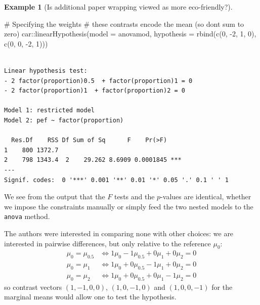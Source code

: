 \documentclass[
  11pt,
  letterpaper,
]{scrbook}
\newenvironment{Shaded}{\begin{snugshade}}{\end{snugshade}}
\newcommand{\AttributeTok}[1]{\textcolor[rgb]{0.40,0.45,0.13}{#1}}
\newcommand{\CommentTok}[1]{\textcolor[rgb]{0.37,0.37,0.37}{#1}}
\newcommand{\DecValTok}[1]{\textcolor[rgb]{0.68,0.00,0.00}{#1}}
\newcommand{\FunctionTok}[1]{\textcolor[rgb]{0.28,0.35,0.67}{#1}}
\newcommand{\NormalTok}[1]{\textcolor[rgb]{0.00,0.23,0.31}{#1}}
\newcommand{\SpecialCharTok}[1]{\textcolor[rgb]{0.37,0.37,0.37}{#1}}
\theoremstyle{definition}
\theoremstyle{definition}
\newtheorem{example}{Example}[chapter]
\theoremstyle{remark}
\begin{document}
\begin{example}[Is additional paper wrapping viewed as more
eco-friendly?]
\begin{Shaded}
\begin{Highlighting}[]
\CommentTok{\# Specifying the weights }
\CommentTok{\# these contrasts encode the mean (so don\textquotesingle{}t sum to zero)}
\NormalTok{car}\SpecialCharTok{::}\FunctionTok{linearHypothesis}\NormalTok{(}\AttributeTok{model =}\NormalTok{ anovamod, }
   \AttributeTok{hypothesis =} \FunctionTok{rbind}\NormalTok{(}\FunctionTok{c}\NormalTok{(}\DecValTok{0}\NormalTok{, }\SpecialCharTok{{-}}\DecValTok{2}\NormalTok{, }\DecValTok{1}\NormalTok{, }\DecValTok{0}\NormalTok{), }
                      \FunctionTok{c}\NormalTok{(}\DecValTok{0}\NormalTok{, }\DecValTok{0}\NormalTok{, }\SpecialCharTok{{-}}\DecValTok{2}\NormalTok{, }\DecValTok{1}\NormalTok{)))}
\end{Highlighting}
\end{Shaded}

\begin{verbatim}

Linear hypothesis test:
- 2 factor(proportion)0.5  + factor(proportion)1 = 0
- 2 factor(proportion)1  + factor(proportion)2 = 0

Model 1: restricted model
Model 2: pef ~ factor(proportion)

  Res.Df    RSS Df Sum of Sq      F    Pr(>F)    
1    800 1372.7                                  
2    798 1343.4  2    29.262 8.6909 0.0001845 ***
---
Signif. codes:  0 '***' 0.001 '**' 0.01 '*' 0.05 '.' 0.1 ' ' 1
\end{verbatim}

We see from the output that the \(F\) tests and the \(p\)-values are
identical, whether we impose the constraints manually or simply feed the
two nested models to the \texttt{anova} method.

The authors were interested in comparing none with other choices: we are
interested in pairwise differences, but only relative to the reference
\(\mu_{0}\): \begin{align*}
\mu_0 = \mu_{0.5}  & \iff 1\mu_0 - 1\mu_{0.5} + 0\mu_{1} + 0 \mu_{2} = 0\\
\mu_0 = \mu_{1} & \iff 1\mu_0 + 0\mu_{0.5} -1\mu_{1} + 0 \mu_{2} = 0\\
\mu_0 = \mu_{2} & \iff 1\mu_0 + 0\mu_{0.5} + 0\mu_{1} -1 \mu_{2} = 0
\end{align*} so contrast vectors \((1, -1, 0, 0)\), \((1, 0, -1, 0)\)
and \((1, 0, 0, -1)\) for the marginal means would allow one to test the
hypothesis.


\end{example}
\end{document}
